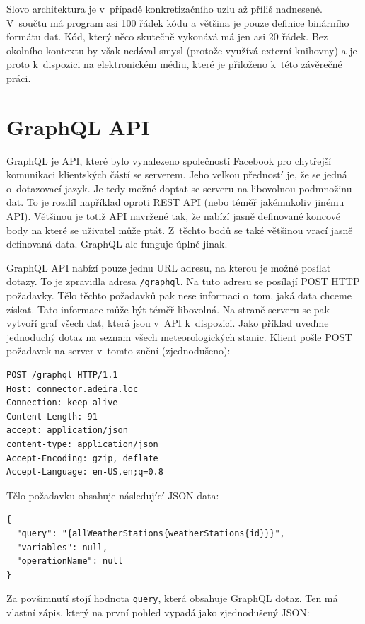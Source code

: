 Slovo architektura je v~případě konkretizačního uzlu až příliš nadnesené. V~součtu má program asi 100 řádek kódu a většina je pouze definice binárního formátu dat. Kód, který něco skutečně vykonává má jen asi 20 řádek. Bez okolního kontextu by však nedával smysl (protože využívá externí knihovny) a je proto k~dispozici na elektronickém médiu, které je přiloženo k~této závěrečné práci.


\section{GraphQL API}
GraphQL \cite{graphql} je API, které bylo vynalezeno společností Facebook pro chy\-třej\-ší komunikaci klientských částí se serverem. Jeho velkou předností je, že se jedná o~dotazovací jazyk. Je tedy možné doptat se serveru na libovolnou podmnožinu dat. To je rozdíl například oproti REST API (nebo téměř ja\-ké\-mu\-ko\-liv jinému API). Většinou je totiž API navržené tak, že nabízí jasně definované koncové body na které se uživatel může ptát. Z~těchto bodů se také většinou vrací jasně definovaná data. GraphQL ale funguje úplně jinak.

GraphQL API nabízí pouze jednu URL adresu, na kterou je možné posílat dotazy. To je zpravidla adresa \texttt{/graphql}. Na tuto adresu se posílají POST HTTP požadavky. Tělo těchto požadavků pak nese informaci o~tom, jaká data chceme získat. Tato informace může být téměř libovolná. Na straně serveru se pak vytvoří graf všech dat, která jsou v~API k~dispozici. Jako příklad uveďme jednoduchý dotaz na seznam všech meteorologických stanic. Klient pošle POST požadavek na server v~tomto znění (zjednodušeno):

\begin{verbatim}
POST /graphql HTTP/1.1
Host: connector.adeira.loc
Connection: keep-alive
Content-Length: 91
accept: application/json
content-type: application/json
Accept-Encoding: gzip, deflate
Accept-Language: en-US,en;q=0.8
\end{verbatim}
%
Tělo požadavku obsahuje následující JSON data:
%
\begin{verbatim}
{
  "query": "{allWeatherStations{weatherStations{id}}}",
  "variables": null,
  "operationName": null
}
\end{verbatim}

Za povšimnutí stojí hodnota \texttt{query}, která obsahuje GraphQL dotaz. Ten má vlastní zápis, který na první pohled vypadá jako zjednodušený JSON:

